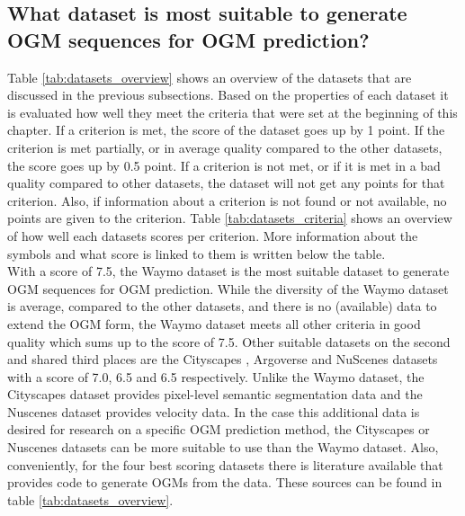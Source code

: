 \subsection{What dataset is most suitable to generate \gls{OGM} sequences for \gls{OGM} prediction?}

Table \ref{tab:datasets_overview} shows an overview of the datasets that are discussed in the previous subsections. Based on the properties of each dataset it is evaluated how well they meet the criteria that were set at the beginning of this chapter. If a criterion is met, the score of the dataset goes up by 1 point. If the criterion is met partially, or in average quality compared to the other datasets, the score goes up by 0.5 point. If a criterion is not met, or if it is met in a bad quality compared to other datasets, the dataset will not get any points for that criterion. Also, if information about a criterion is not found or not available, no points are given to the criterion. Table \ref{tab:datasets_criteria} shows an overview of how well each datasets scores per criterion. More information about the symbols and what score is linked to them is written below the table. \\

With a score of 7.5, the Waymo \cite{sun2020scalability} dataset is the most suitable dataset to generate \gls{OGM} sequences for \gls{OGM} prediction. While the diversity of the Waymo dataset is average, compared to the other datasets, and there is no (available) data to extend the \gls{OGM} form, the Waymo dataset meets all other criteria in good quality which sums up to the score of 7.5. Other suitable datasets on the second and shared third places are the Cityscapes \cite{cordts2016cityscapes}, Argoverse \cite{chang2019argoverse} and NuScenes \cite{caesar2020nuscenes} datasets with a score of 7.0, 6.5 and 6.5 respectively. Unlike the Waymo dataset, the Cityscapes dataset provides pixel-level semantic segmentation data and the Nuscenes dataset provides velocity data. In the case this additional data is desired for research on a specific \gls{OGM} prediction method, the Cityscapes or Nuscenes datasets can be more suitable to use than the Waymo dataset. Also, conveniently, for the four best scoring datasets there is literature available that provides code to generate \glspl{OGM} from the data. These sources can be found in table \ref{tab:datasets_overview}.  

